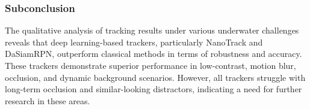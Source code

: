 \subsubsection{Subconclusion}
The qualitative analysis of tracking results under various underwater challenges reveals that deep learning-based trackers, particularly NanoTrack and DaSiamRPN, outperform classical methods in terms of robustness and accuracy. These trackers demonstrate superior performance in low-contrast, motion blur, occlusion, and dynamic background scenarios. However, all trackers struggle with long-term occlusion and similar-looking distractors, indicating a need for further research in these areas.


\endinput